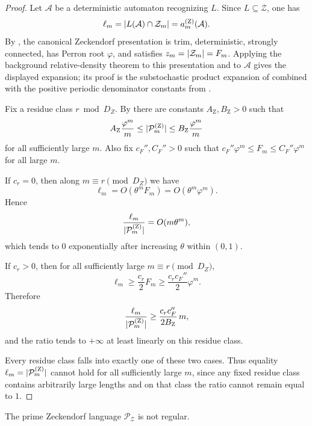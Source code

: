 \begin{proof}
  Let \(\mathcal A\) be a deterministic automaton recognizing \(L\).
  Since \(L\subseteq\mathcal Z\), one has
  \[
    \ell_m=\lvert L(\mathcal A)\cap\mathcal Z_m \rvert
          =a_m^{(\mathrm Z)}(\mathcal A).
  \]
  By , the canonical
  Zeckendorf presentation is trim, deterministic, strongly connected,
  has Perron root \(\varphi\), and satisfies
  \(z_m=\lvert \mathcal Z_m \rvert=F_m\). Applying
  the background relative-density theorem
   to this presentation and to
  \(\mathcal A\) gives the displayed expansion; its proof is the
  substochastic product expansion of
   combined with the positive
  periodic denominator constants from .

  Fix a residue class \(r\bmod D_Z\). By 
  there are constants \(A_{\mathrm Z},B_{\mathrm Z}>0\) such that
  \[
    A_{\mathrm Z}\frac{\varphi^m}{m}
    \le\lvert \mathcal P_m^{(\mathrm Z)} \rvert
    \le B_{\mathrm Z}\frac{\varphi^m}{m}
  \]
  for all sufficiently large \(m\). Also fix \(c_F'',C_F''>0\) such that
  \(c_F''\varphi^m\le F_m\le C_F''\varphi^m\) for all large \(m\).

  If \(c_r=0\), then along \(m\equiv r\pmod {D_Z}\) we have
  \[
    \ell_m=O(\theta^mF_m)=O(\theta^m\varphi^m).
  \]
  Hence
  \[
    \frac{\ell_m}{\lvert \mathcal P_m^{(\mathrm Z)} \rvert}
    =O(m\theta^m),
  \]
  which tends to \(0\) exponentially after increasing \(\theta\) within
  \((0,1)\).

  If \(c_r>0\), then for all sufficiently large
  \(m\equiv r\pmod {D_Z}\),
  \[
    \ell_m\ge\frac{c_r}{2}F_m
        \ge\frac{c_rc_F''}{2}\varphi^m.
  \]
  Therefore
  \[
    \frac{\ell_m}{\lvert \mathcal P_m^{(\mathrm Z)} \rvert}
    \ge
    \frac{c_rc_F''}{2B_{\mathrm Z}}\,m,
  \]
  and the ratio tends to \(+\infty\) at least linearly on this residue
  class.

  Every residue class falls into exactly one of these two cases. Thus
  equality
  \(\ell_m=\lvert \mathcal P_m^{(\mathrm Z)} \rvert\) cannot hold for all
  sufficiently large \(m\), since any fixed residue class contains
  arbitrarily large lengths and on that class the ratio cannot remain
  equal to \(1\).
\end{proof}

\begin{corollary}
  \label{cor:zeckendorf-prime-language-not-regular}
  The prime Zeckendorf language \(\mathcal P_{\mathcal Z}\) is not
  regular.
\end{corollary}

